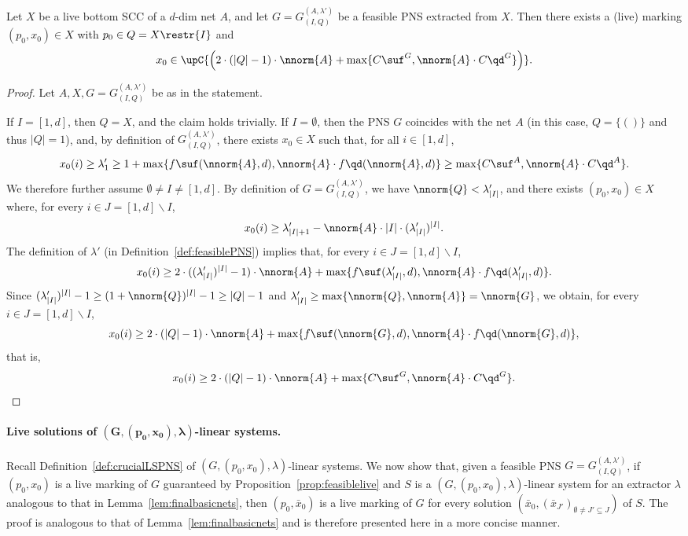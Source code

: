 \begin{prop}\label{prop:feasiblelive}
	Let $X$ be a live bottom SCC of
	a $d$-dim net $A$, 
and let $G=G_{(I,Q)}^{(A,\lambda')}$ be a feasible PNS extracted from
	$X$.
Then there exists  a (live)	marking
	$(p_0,x_0)\in X$ with $p_0\in Q=X\restr{I}$ and
	\[x_0\in\upC{\left(
2\cdot(|Q|-1)\cdot\nnorm{A}+
		\max\{C\suf^G,\nnorm{A}\cdot C\qd^G\}\right)}.\]
\end{prop}	
\begin{proof}
Let $A,X,G=G_{(I,Q)}^{(A,\lambda')}$ be as in the statement.

		If $I=[1,d]$, then $Q=X$, and the claim holds
		trivially.
	If $I=\emptyset$, then the PNS $G$ coincides with the net $A$
	(in this case, $Q=\{()\}$ and thus $|Q|=1$), and, by
	definition of $G_{(I,Q)}^{(A,\lambda')}$, 
	there exists $x_0\in X$ such that, for all
	$i\in[1,d]$,
	\[x_0(i)\geq 	\lambda'_1\geq
	1+\max\{f\suf(\nnorm{A},d),\nnorm{A}\cdot
			f\qd(\nnorm{A},d)\}\geq
 \max\{C\suf^A,\nnorm{A}\cdot
	C\qd^A\}.\]
	We therefore further assume $\emptyset\neq I\neq [1,d]$.
By definition of $G=G_{(I,Q)}^{(A,\lambda')}$,
we have $\nnorm{Q}<\lambda'_{|I|}$, and there exists $(p_0,x_0)\in X$
	where, for every
	$i\in J=[1,d]\smallsetminus I$, 
\[x_0(i)\geq\lambda'_{|I|+1}-\nnorm{A}\cdot
	|I|\cdot(\lambda'_{|I|})^{|I|}.\]
	The definition of $\lambda'$ (in
	Definition~\ref{def:feasiblePNS}) implies that,  for every
	$i\in J=[1,d]\smallsetminus I$, 
	\[x_0(i)\geq
	2\cdot((\lambda'_{|I|})^{|I|}-1)\cdot\nnorm{A}+
		\max\{f\suf(\lambda'_{|I|},d),\nnorm{A}\cdot
		f\qd(\lambda'_{|I|},d)\}.\]
	Since $(\lambda'_{|I|})^{|I|}-1\geq (1+\nnorm{Q})^{|I|}-1\geq
	|Q|-1$ and $\lambda'_{|I|}\geq
	\max\{\nnorm{Q},\nnorm{A}\}=\nnorm{G}$,
	we obtain,  for every
	$i\in J=[1,d]\smallsetminus I$, 
	\[x_0(i)\geq
	2\cdot(|Q|-1)\cdot\nnorm{A}+
		\max\{f\suf(\nnorm{G},d),\nnorm{A}\cdot
		f\qd(\nnorm{G},d)\},\]
that is,
	\[x_0(i)\geq
2\cdot(|Q|-1)\cdot\nnorm{A}+
		\max\{C\suf^G,\nnorm{A}\cdot C\qd^G\}.\qedhere\]
\end{proof}	


\paragraph{Live solutions of $\bm{(G,(p_0,x_0),\lambda)}$-linear systems.}
Recall Definition~\ref{def:crucialLSPNS} of $(G,(p_0,x_0),\lambda)$-linear systems.
We now show that, given a feasible PNS $G=G^{(A,\lambda')}_{(I,Q)}$,
if $(p_0,x_0)$ is a live marking of $G$ guaranteed by
Proposition~\ref{prop:feasiblelive}
and $S$ is a $(G,(p_0,x_0),\lambda)$-linear system for an extractor
$\lambda$ analogous to that in Lemma~\ref{lem:finalbasicnets},
then $(p_0,\bar{x}_0)$ is a live marking of $G$ 
for every solution
$(\bar{x}_0,(\bar{x}_{J'})_{\emptyset\neq J'\subseteq J})$
of $S$.
The proof is analogous to that of Lemma~\ref{lem:finalbasicnets} and
is therefore presented here in a more concise manner.



